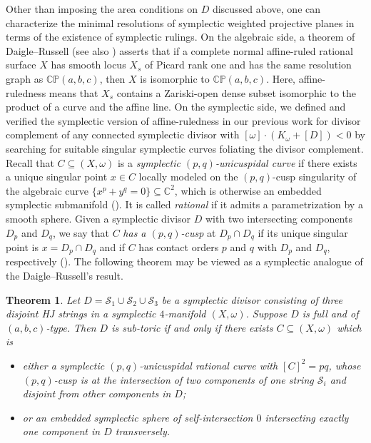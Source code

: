 \documentclass[11pt]{article}
\newtheorem{theorem}{Theorem}[section]
\theoremstyle{definition}
\theoremstyle{remark}
\newcommand{\CP}{\mathbb{CP}}
\newcommand{\C}{\mathbb{C}}
\newcommand{\st}{\mathcal{S}}
\begin{document}
Other than imposing the area conditions on $D$ discussed above, one can characterize the minimal resolutions of symplectic weighted projective planes in terms of the existence of symplectic rulings. On the algebraic side, a theorem of Daigle--Russell \cite{DP2} (see also \cite{DP1}) asserts that if a complete normal affine-ruled rational surface $X$ has smooth locus $X_s$ of Picard rank one and has the same resolution graph as $\CP(a,b,c)$, then $X$ is isomorphic to $\CP(a,b,c)$. Here, affine-ruledness means that $X_s$ contains a Zariski-open dense subset isomorphic to the product of a curve and the affine line. On the symplectic side, we defined and verified the symplectic version of affine-ruledness in our previous work \cite{LN25} for divisor complement of any connected symplectic divisor with $[\omega]\cdot(K_\omega+[D])<0$ by searching for suitable singular symplectic curves foliating the divisor complement. Recall that $C\subseteq (X,\omega)$ is a \emph{symplectic $(p,q)$-unicuspidal curve} if there exists a unique singular point $x\in C$ locally modeled on the $(p,q)$-cusp singularity of the algebraic curve $\{x^p+y^q=0\}\subseteq \C^2$, which is otherwise an embedded symplectic submanifold (\cite[Definition 3.5.1]{McduffSiegel}). It is called \emph{rational} if it admits a parametrization by a smooth sphere. Given a symplectic divisor $D$ with two intersecting components $D_p$ and $D_q$, we say that $C$ \emph{has a $(p,q)$-cusp} at $D_p\cap D_q$ if its unique singular point is $x=D_p\cap D_q$ and if $C$ has contact orders $p$ and $q$ with $D_p$ and $D_q$, respectively (\cite[Section 2.2]{MScounting}). The following theorem may be viewed as a symplectic analogue of the Daigle--Russell's result.

\begin{theorem}\label{thm:ruling}
Let $D=\st_1\cup\st_2\cup\st_3$ be a symplectic divisor consisting of three disjoint HJ strings in a symplectic $4$-manifold $(X,\omega)$. Suppose $D$ is full and of $(a,b,c)$-type. Then $D$ is sub-toric if and only if there exists $C\subseteq (X,\omega)$ which is
\begin{itemize}[nosep]
  \item either a symplectic $(p,q)$-unicuspidal rational curve with $[C]^2=pq$, whose $(p,q)$-cusp is at the intersection of two components of one string $\st_i$ and disjoint from other components in $D$;
  \item or an embedded symplectic sphere of self-intersection $0$ intersecting exactly one component in $D$ transversely.
\end{itemize} 
\end{theorem}
\end{document}
